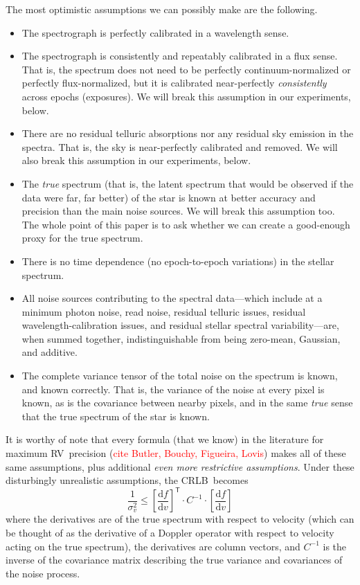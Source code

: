 \documentclass[modern]{aastex62}
\newcommand{\dd}{\mathrm{d}}
\newcommand{\T}{^{\mathsf{T}}}
\newcommand{\todo}[1]{\textcolor{red}{#1}}  %
\newcommand{\acronym}[1]{{\small{#1}}}
\newcommand{\RV}{\acronym{RV}}
\newcommand{\CRLB}{\acronym{CRLB}}
\begin{document}
The most optimistic assumptions we can possibly make are the following.
\begin{itemize}
\item The spectrograph is perfectly calibrated in a wavelength sense.
\item The spectrograph is consistently and repeatably calibrated in a
  flux sense. That is, the spectrum does not need to be perfectly
  continuum-normalized or perfectly flux-normalized, but it is
  calibrated near-perfectly \emph{consistently} across epochs (exposures).
  We will break this assumption in our experiments, below.
\item There are no residual telluric absorptions nor any residual sky
  emission in the spectra. That is, the sky is near-perfectly calibrated
  and removed.
  We will also break this assumption in our experiments, below.
\item The \emph{true} spectrum (that is, the latent spectrum that
  would be observed if the data were far, far better) of the star is
  known at better accuracy and precision than the main noise sources.
  We will break this assumption too.
  The whole point of this paper is to ask whether we can create a
  good-enough proxy for the true spectrum.
\item There is no time dependence (no epoch-to-epoch variations) in the
  stellar spectrum.
\item All noise sources contributing to the spectral data---which
  include at a minimum photon noise, read noise, residual telluric
  issues, residual wavelength-calibration issues, and residual stellar
  spectral variability---are, when summed together, indistinguishable
  from being zero-mean, Gaussian, and additive.
\item The complete variance tensor of the total noise on the spectrum is known, and
  known correctly. That is, the variance of the noise at every pixel
  is known, as is the covariance between nearby pixels, and in the
  same \emph{true} sense that the true spectrum of the star is known.
\end{itemize}
It is worthy of note that every formula (that we know) in the
literature for maximum \RV\ precision (\todo{cite Butler, Bouchy,
  Figueira, Lovis}) makes all of these same assumptions,
plus additional \emph{even more restrictive assumptions}.
Under these disturbingly unrealistic assumptions, the \CRLB\ becomes
\begin{equation}\label{eq:crlb}
\frac{1}{\sigma_v^2} \leq \left[\frac{\dd f}{\dd v}\right]\T\cdot C^{-1}\cdot\left[\frac{\dd f}{\dd v}\right]
\end{equation}
where the derivatives are of the true spectrum with respect to
velocity (which can be thought of as the derivative of a Doppler
operator with respect to velocity acting on the true spectrum), the
derivatives are column vectors, and $C^{-1}$ is the inverse of the covariance matrix
describing the true variance and covariances of the noise process.
\end{document}
